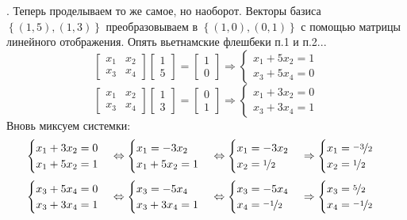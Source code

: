 \documentclass[a3paper,14pt]{extarticle}
\begin{document}
. Теперь проделываем то же самое, но наоборот. Векторы базиса $\left\{(1, 5), (1, 3)\right\}$ преобразовываем в $\left\{(1, 0), (0, 1)\right\}$ с помощью матрицы линейного отображения. Опять вьетнамские флешбеки п.1 и п.2...
$$\begin{bmatrix}
    x_1 & x_2 \\ x_3 & x_4
\end{bmatrix}\begin{bmatrix}
    1 \\ 5
\end{bmatrix} = \begin{bmatrix}
    1 \\ 0
\end{bmatrix} \Rightarrow \begin{cases}
    x_1 + 5x_2 = 1 \\ x_3 + 5x_4 = 0
\end{cases}$$
$$\begin{bmatrix}
    x_1 & x_2 \\ x_3 & x_4
\end{bmatrix}\begin{bmatrix}
    1 \\ 3
\end{bmatrix} = \begin{bmatrix}
    0 \\ 1
\end{bmatrix} \Rightarrow \begin{cases}
    x_1 + 3x_2 = 0 \\ x_3 + 3x_4 = 1
\end{cases}$$
Вновь миксуем системки:
$$\begin{cases}
    x_1 + 3x_2 = 0 \\ x_1 + 5x_2 = 1
\end{cases} \Leftrightarrow \begin{cases}
    x_1 = -3x_2 \\ x_1 + 5x_2 = 1
\end{cases} \Leftrightarrow \begin{cases}
    x_1 = -3x_2 \\ x_2 = \nicefrac{1}{2}
\end{cases} \Rightarrow \begin{cases}
    x_1 = \nicefrac{-3}{2} \\ x_2 = \nicefrac{1}{2}
\end{cases}$$
$$\begin{cases}
    x_3 + 5x_4 = 0 \\ x_3 + 3x_4 = 1
\end{cases} \Leftrightarrow \begin{cases}
    x_3 = -5x_4 \\ x_3 + 3x_4 = 1
\end{cases} \Leftrightarrow \begin{cases}
    x_3 = -5x_4 \\ x_4 = \nicefrac{-1}{2}
\end{cases} \Rightarrow \begin{cases}
    x_3 = \nicefrac{5}{2} \\ x_4 = \nicefrac{-1}{2}
\end{cases}
$$
\end{document}
